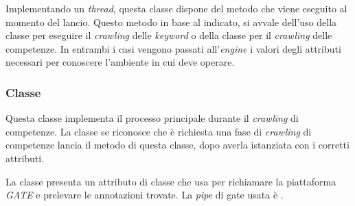 \documentclass[tesi.tex]{subfiles}
\begin{document}
Implementando un \emph{thread}, questa classe dispone del metodo
 che viene eseguito al momento del lancio. Questo metodo in
base al  indicato, si avvale dell'uso della classe
 per eseguire il \emph{crawling} delle
\emph{keyword} o della classe  per il
\emph{crawling} delle competenze. In entrambi i casi vengono passati
all'\emph{engine} i valori degli attributi necessari per conoscere
l'ambiente in cui deve operare.

\subsubsection{Classe }
\begin{center}
\end{center}
Questa classe implementa il processo principale durante il
\emph{crawling} di competenze. La classe 
se riconosce che \`e richiesta una fase di \emph{crawling} di
competenze lancia il metodo  di questa classe, dopo averla
istanziata con i corretti attributi.

La classe presenta un attributo  di classe
 che usa per richiamare la piattaforma
\emph{GATE} e prelevare le annotazioni trovate. La \emph{pipe} di gate
usata \`e .
\end{document}
